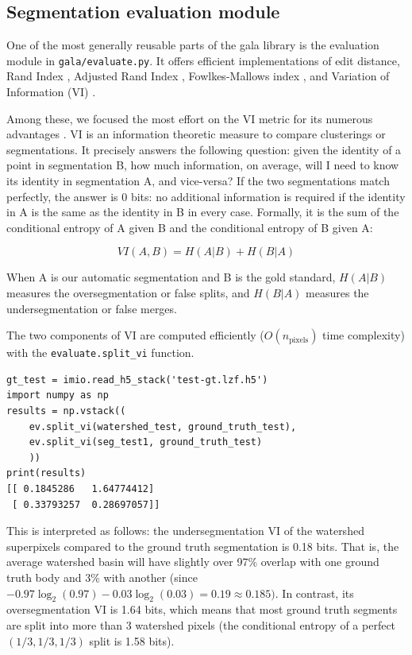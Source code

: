 \documentclass{frontiersSCNS} %
\begin{document}
\subsection{Segmentation evaluation module}

One of the most generally reusable parts of the gala library is the evaluation module in \texttt{\small gala/evaluate.py}.
It offers efficient implementations of edit distance, Rand Index \citep{Rand:1971uy}, Adjusted Rand Index \citep{Hubert:1985}, Fowlkes-Mallows index \citep{Fowlkes:1983wz}, and Variation of Information (VI) \citep{meila:2005}.

Among these, we focused the most effort on the VI metric for its numerous advantages \citep{meila:2005, NunezIglesias:2013cd}.
VI is an information theoretic measure to compare clusterings or segmentations.
It precisely answers the following question: given the identity of a point in segmentation B, how much information, on average, will I need to know its identity in segmentation A, and vice-versa?
If the two segmentations match perfectly, the answer is 0 bits: no additional information is required if the identity in A is the same as the identity in B in every case.
Formally, it is the sum of the conditional entropy of A given B and the conditional entropy of B given A:

\begin{equation}
VI(A, B) = H(A | B) + H(B | A)
\end{equation}

When A is our automatic segmentation and B is the gold standard, $H(A|B)$ measures the oversegmentation or false splits, and $H(B|A)$ measures the undersegmentation or false merges.

The two components of VI are computed efficiently ($O(n_{\textrm{pixels}})$ time complexity) with the \texttt{\small evaluate.split\_vi} function.

{\small
\begin{verbatim}
gt_test = imio.read_h5_stack('test-gt.lzf.h5')
import numpy as np
results = np.vstack((
    ev.split_vi(watershed_test, ground_truth_test),
    ev.split_vi(seg_test1, ground_truth_test)
    ))
print(results)
[[ 0.1845286   1.64774412]
 [ 0.33793257  0.28697057]]
\end{verbatim}
}

This is interpreted as follows: the undersegmentation VI of the watershed superpixels compared to the ground truth segmentation is 0.18 bits.
That is, the average watershed basin will have slightly over 97\% overlap with one ground truth body and 3\% with another (since $-0.97 \log_2(0.97) - 0.03\log_2(0.03) = 0.19 \approx 0.185)$.
In contrast, its oversegmentation VI is 1.64 bits, which means that most ground truth segments are split into more than 3 watershed pixels (the conditional entropy of a perfect $(1/3, 1/3, 1/3)$ split is 1.58 bits).
\end{document}
